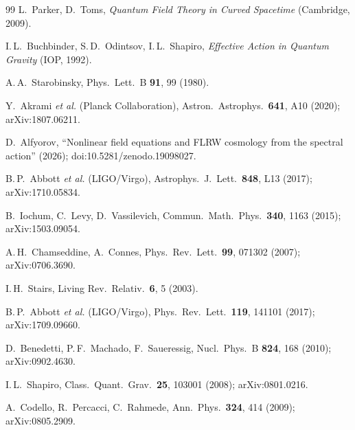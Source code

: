 \documentclass[12pt]{article}
\begin{document}
\begin{thebibliography}{99}
L.~Parker, D.~Toms, \textit{Quantum Field Theory in Curved
Spacetime} (Cambridge, 2009).

I.\,L.~Buchbinder, S.\,D.~Odintsov, I.\,L.~Shapiro,
\textit{Effective Action in Quantum Gravity} (IOP, 1992).

A.\,A.~Starobinsky, Phys.\ Lett.\ B \textbf{91}, 99 (1980).

Y.~Akrami \textit{et al.} (Planck Collaboration), Astron.\
Astrophys.\ \textbf{641}, A10 (2020); arXiv:1807.06211.

D.~Alfyorov, ``Nonlinear field equations and FLRW cosmology
from the spectral action'' (2026); doi:10.5281/zenodo.19098027.

B.\,P.~Abbott \textit{et al.} (LIGO/Virgo), Astrophys.\ J.\
Lett.\ \textbf{848}, L13 (2017); arXiv:1710.05834.

B.~Iochum, C.~Levy, D.~Vassilevich, Commun.\ Math.\ Phys.\
\textbf{340}, 1163 (2015); arXiv:1503.09054.

\bibitem{CC:2006dilaton}
A.\,H.~Chamseddine, A.~Connes, Phys.\ Rev.\ Lett.\
\textbf{99}, 071302 (2007); arXiv:0706.3690.

\bibitem{Stairs:2003}
I.\,H.~Stairs, Living Rev.\ Relativ.\ \textbf{6}, 5 (2003).

B.\,P.~Abbott \textit{et al.} (LIGO/Virgo), Phys.\ Rev.\
Lett.\ \textbf{119}, 141101 (2017); arXiv:1709.09660.

D.~Benedetti, P.\,F.~Machado, F.~Saueressig, Nucl.\ Phys.\ B
\textbf{824}, 168 (2010); arXiv:0902.4630.

I.\,L.~Shapiro, Class.\ Quant.\ Grav.\ \textbf{25}, 103001
(2008); arXiv:0801.0216.

A.~Codello, R.~Percacci, C.~Rahmede, Ann.\ Phys.\
\textbf{324}, 414 (2009); arXiv:0805.2909.

\end{thebibliography}
\end{document}
